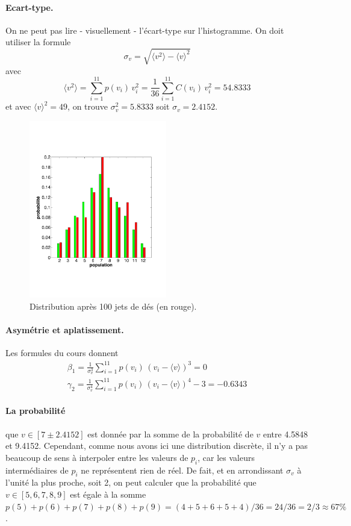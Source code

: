 \paragraph{Ecart-type.} On ne peut pas lire - visuellement - l'écart-type sur l'histogramme. On doit utiliser la formule
$$
\sigma_v=\sqrt{\langle v^2 \rangle-\langle v \rangle^2}
$$
avec
$$
\langle v^2 \rangle=\sum\limits_{i=1}^{11}p(v_i)\,v_i^2=
\frac{1}{36}\sum\limits_{i=1}^{11}C(v_i)\,v_i^2=54.8333
$$
et avec $\langle v \rangle^2=49$, on trouve $\sigma_v^2=5.8333$ soit $\sigma_v=2.4152$.

\begin{figure}
	\centering
	\vspace{-5mm}
	\includegraphics[width=6cm]{assets/figures/Serie2_exe01fig2.pdf}
	\caption{Distribution après 100 jets de dés (en rouge).}
	\label{fig:exe1fig2}
\end{figure}
\paragraph{Asymétrie et aplatissement.} Les formules du cours donnent
\begin{gather}
\beta_1=\frac{1}{\sigma_v^3}\sum\limits_{i=1}^{11}p(v_i)\,(v_i-\langle v \rangle)^3=0\\
\gamma_2=\frac{1}{\sigma_v^4}\sum\limits_{i=1}^{11}p(v_i)\,(v_i-\langle v \rangle)^4-3=-0.6343
\end{gather}

\paragraph{La probabilité} que $v\in[7\pm2.4152]$ est donnée par la somme de la probabilité de $v$ entre 4.5848 et 9.4152. Cependant, comme nous avons ici une distribution discrète, il n'y a pas beaucoup de sens à interpoler entre les valeurs de $p_i$, car les valeurs intermédiaires de $p_i$ ne représentent rien de réel. De fait, et en arrondissant $\sigma_v$ à l'unité la plus proche, soit 2, on peut calculer que la probabilité que $v\in[5,6,7,8,9]$ est égale à la somme $p(5)+p(6)+p(7)+p(8)+p(9)=(4+5+6+5+4)/36=24/36=2/3\approx 67\%$.

